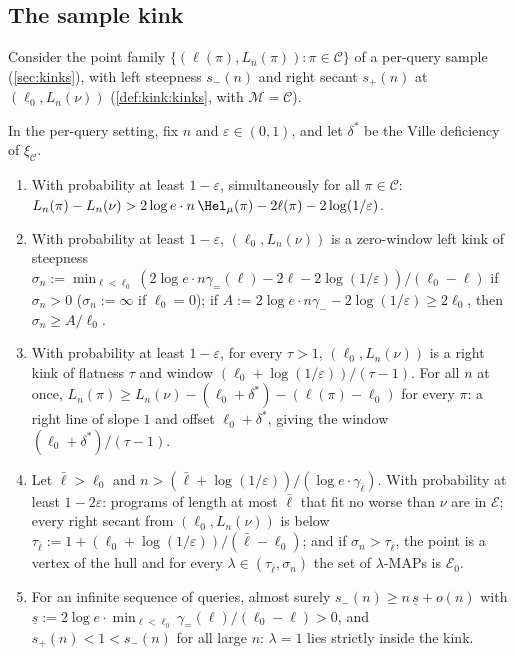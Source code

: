 \subsection{The sample kink}\label{sec:recovery:kink}

Consider the point family $\{(\ell(\pi),L_n(\pi)):\pi\in\mathcal C\}$ of a per-query sample (\cref{sec:kinks}), with left steepness $s_-(n)$ and right secant $s_+(n)$ at $(\ell_0,L_n(\nu))$ (\cref{def:kink:kinks}, with $\mathcal M=\mathcal C$).

\begin{theorem}\label{thm:recovery:kink}
In the per-query setting, fix $n$ and $\varepsilon\in(0,1)$, and let $\delta^*$ be the Ville deficiency of $\xi_{\mathcal C}$.
\begin{enumerate}[label=(\roman*),itemsep=0pt,topsep=2pt]
\item With probability at least $1-\varepsilon$, simultaneously for all $\pi\in\mathcal C$: $L_n(\pi)-L_n(\nu)>2\log e\cdot n\,{\Hel}_\mu(\pi)-2\ell(\pi)-2\log(1/\varepsilon)$.
\item With probability at least $1-\varepsilon$, $(\ell_0,L_n(\nu))$ is a zero-window left kink of steepness $\sigma_n:=\min_{\ell<\ell_0}(2\log e\cdot n\gamma_=(\ell)-2\ell-2\log(1/\varepsilon))/(\ell_0-\ell)$ if $\sigma_n>0$ ($\sigma_n:=\infty$ if $\ell_0=0$); if $A:=2\log e\cdot n\gamma_--2\log(1/\varepsilon)\ge2\ell_0$, then $\sigma_n\ge A/\ell_0$.
\item With probability at least $1-\varepsilon$, for every $\tau>1$, $(\ell_0,L_n(\nu))$ is a right kink of flatness $\tau$ and window $(\ell_0+\log(1/\varepsilon))/(\tau-1)$. For all $n$ at once, $L_n(\pi)\ge L_n(\nu)-(\ell_0+\delta^*)-(\ell(\pi)-\ell_0)$ for every $\pi$: a right line of slope $1$ and offset $\ell_0+\delta^*$, giving the window $(\ell_0+\delta^*)/(\tau-1)$.
\item Let $\bar\ell>\ell_0$ and $n>(\bar\ell+\log(1/\varepsilon))/(\log e\cdot\gamma_{\bar\ell})$. With probability at least $1-2\varepsilon$: programs of length at most $\bar\ell$ that fit no worse than $\nu$ are in $\mathcal E$; every right secant from $(\ell_0,L_n(\nu))$ is below $\tau_{\bar\ell}:=1+(\ell_0+\log(1/\varepsilon))/(\bar\ell-\ell_0)$; and if $\sigma_n>\tau_{\bar\ell}$, the point is a vertex of the hull and for every $\lambda\in(\tau_{\bar\ell},\sigma_n)$ the set of $\lambda$-MAPs is $\mathcal E_0$.
\item For an infinite sequence of queries, almost surely $s_-(n)\ge n\,\underline s+o(n)$ with $\underline s:=2\log e\cdot\min_{\ell<\ell_0}\gamma_=(\ell)/(\ell_0-\ell)>0$, and $s_+(n)<1<s_-(n)$ for all large $n$: $\lambda=1$ lies strictly inside the kink.
\end{enumerate}
\end{theorem}

